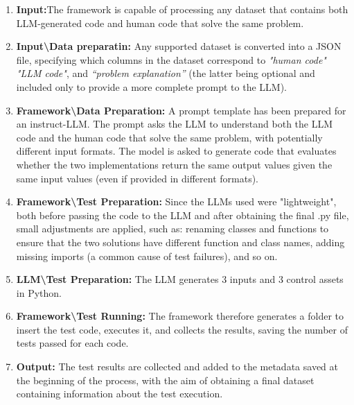 \begin{enumerate}
\item \textbf{Input:}The framework is capable of processing any dataset 
that contains both LLM-generated code and human code that solve the same problem.

\item \textbf{Input\textbackslash Data preparatin:} Any supported dataset is converted into a JSON file, 
specifying which columns in the dataset correspond to \textit{"human code"} \textit{"LLM code"}, and 
\textit{“problem explanation”} (the latter being optional and included only to 
provide a more complete prompt to the LLM).

\item \textbf{Framework\textbackslash Data Preparation:} A prompt template has 
been prepared for an instruct-LLM. The prompt asks the LLM to understand both the LLM code and 
the human code that solve the same problem, with potentially different input formats. 
The model is asked to generate code that evaluates whether the two implementations return 
the same output values given the same input values (even if provided in different formats).



\item \textbf{Framework\textbackslash Test Preparation:} Since the LLMs used were "lightweight", 
both before passing the code to the LLM and after obtaining the final .py file, small 
adjustments are applied, such as: renaming classes and functions to ensure that the two 
solutions have different function and class names, adding missing imports 
(a common cause of test failures), and so on.

\item \textbf{LLM\textbackslash Test Preparation:} The LLM generates 3 inputs and 3 control assets in Python.

\item \textbf{Framework\textbackslash Test Running:} The framework therefore generates a folder 
to insert the test code, executes it, and collects the results, saving the number of tests 
passed for each code.

\item \textbf{Output:} The test results are collected and added to the 
metadata saved at the beginning of the process, with the aim of obtaining a 
final dataset containing information about the test execution.



\end{enumerate}




